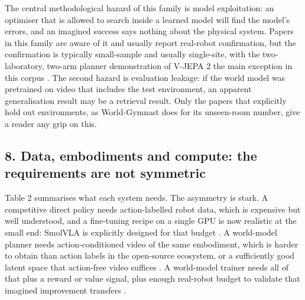 \documentclass[
  10pt,
  english,
]{article}
\begin{document}
The central methodological hazard of this family is model exploitation:
an optimiser that is allowed to search inside a learned model will find
the model's errors, and an imagined success says nothing about the
physical system. Papers in this family are aware of it and usually
report real-robot confirmation, but the confirmation is typically
small-sample and usually single-site, with the two-laboratory, two-arm
planner demonstration of V-JEPA 2 the main exception in this corpus
\citep{vjepa2}. The second hazard is evaluation leakage: if the world
model was pretrained on video that includes the test environment, an
apparent generalisation result may be a retrieval result. Only the
papers that explicitly hold out environments, as World-Gymnast does for
its unseen-room number, give a reader any grip on this.

\hypertarget{data-embodiments-and-compute-the-requirements-are-not-symmetric}{%
\subsection{8. Data, embodiments and compute: the requirements are not
symmetric}\label{data-embodiments-and-compute-the-requirements-are-not-symmetric}}

Table 2 summarises what each system needs. The asymmetry is stark. A
competitive direct policy needs action-labelled robot data, which is
expensive but well understood, and a fine-tuning recipe on a single GPU
is now realistic at the small end: SmolVLA is explicitly designed for
that budget \citep{smolvla}. A world-model planner needs
action-conditioned video of the same embodiment, which is harder to
obtain than action labels in the open-source ecosystem, or a
sufficiently good latent space that action-free video suffices
\citep{dino_wm, vjepa2}. A world-model trainer needs all of that plus a
reward or value signal, plus enough real-robot budget to validate that
imagined improvement transfers \citep{dreamer4, world_gymnast}.
\end{document}
